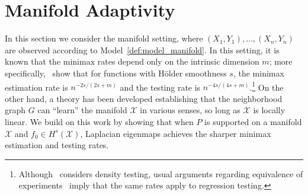 \documentclass[aos]{imsart}
\theoremstyle{plain}
\theoremstyle{definition}
\theoremstyle{remark}
\newcommand{\mc}[1]{\mathcal{#1}}
\newcommand{\1}{\mathbf{1}}
\begin{document}

\section{Manifold Adaptivity}
\label{sec:manifold_adaptivity}

In this section we consider the manifold setting, where $(X_1,Y_1),\ldots,(X_n,Y_n)$ are observed according to Model~\ref{def:model_manifold}. In this setting, it is known that the minimax rates depend only on the intrinsic dimension $m$; more specifically,~\cite{bickel2007,ariascastro2018} show that for functions with H\"{o}lder smoothness $s$, the minimax estimation rate is $n^{-2s/(2s + m)}$ and the testing rate is $n^{-4s/(4s + m)}$.\footnote{Although~\cite{ariascastro2018} considers density testing, usual arguments regarding equivalence of experiments~\citep{brown96} imply that the same rates apply to regression testing.} On the other hand, a theory has been developed \citep{niyogi2008finding,belkin03,belkin05,niyogi2013,balakrishnan2012minimax,balakrishnan2013cluster} establishing that the neighborhood graph $G$ can ``learn'' the manifold $\mc{X}$ in various senses, so long as $\mc{X}$ is locally linear.  We build on this work by showing that when $P$ is supported on a manifold $\mc{X}$ and $f_0 \in H^s(\mc{X})$, Laplacian eigenmaps achieves the sharper minimax estimation and testing rates.
\end{document}
